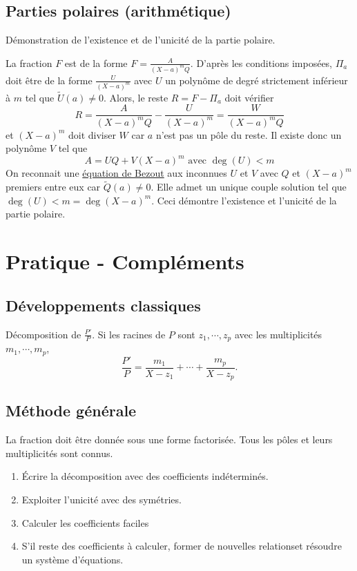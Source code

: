 \subsection{Parties polaires (arithmétique)}
Démonstration de l'existence et de l'unicité de la partie polaire.
\begin{demo}
La fraction $F$ est de la forme $F=\frac{A}{(X-a)^mQ}$.
D'après les conditions imposées, $\Pi_a$ doit être de la forme $\frac{U}{(X-a)^m}$ avec $U$ un polynôme de degré strictement inférieur à $m$ tel que $\widetilde{U}(a)\neq0$. Alors, le reste $R=F-\Pi_a$ doit vérifier
\begin{displaymath}
 R= \frac{A}{(X-a)^mQ} - \frac{U}{(X-a)^m} = \frac{W}{(X-a)^mQ}
\end{displaymath}
et $(X-a)^m$ doit diviser $W$ car $a$ n'est pas un  pôle du reste. Il existe donc un polynôme $V$ tel que
\begin{displaymath}
 A = UQ + V(X-a)^m \text{ avec } \deg(U)< m
\end{displaymath}
On reconnait une  \href{\baseurl C5546.pdf}{équation de Bezout} aux inconnues $U$ et $V$ avec $Q$ et $(X-a)^m$ premiers entre eux car $\widetilde{Q}(a)\neq 0$. Elle admet un unique couple solution tel que $\deg(U)<m=\deg(X-a)^m$. Ceci démontre l'existence et l'unicité de la partie polaire.\\
\end{demo}

\section{Pratique - Compléments}

\subsection{Développements classiques}
Décomposition de $\frac{P'}{P}$.\newline
Si les racines de $P$ sont $z_1,\cdots, z_p$ avec les multiplicités $m_1,\cdots, m_p$,
\[
 \frac{P'}{P} = \frac{m_1}{X - z_1} + \cdots + \frac{m_p}{X - z_p}.
\]


\subsection{Méthode générale}
La fraction doit être donnée sous une forme factorisée. Tous les pôles et leurs multiplicités sont connus.
\begin{enumerate}
 \item \'Ecrire la décomposition avec des coefficients indéterminés.
 \item Exploiter l'unicité avec des symétries.
 \item Calculer les coefficients faciles
 \item S'il reste des coefficients à calculer, former de nouvelles relationset résoudre un système d'équations.
\end{enumerate}


